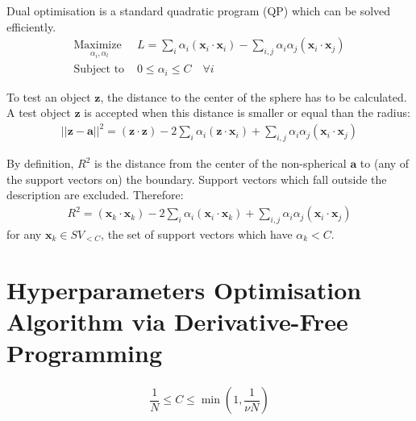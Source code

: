 \documentclass[3p,times]{elsarticle}
\begin{document}
Dual optimisation is a standard quadratic program (QP) which can be solved efficiently.
\begin{subequations}\label{eq:svdd_dual}
\begin{align}
\underset{
	\begin{array}{c}
		 \alpha_i, \alpha_l
	\end{array}}{\text{Maximize }} & L = \sum_i \alpha_i \left( \mathbf{x}_i \cdot \mathbf{x}_i \right) - \sum_{i,j} \alpha_i \alpha_j \left( \mathbf{x}_i \cdot \mathbf{x}_j \right)\\
\text{Subject to } & 0 \le \alpha_i \le C \quad \forall i
\end{align}
\end{subequations}

To test an object $\mathbf{z}$, the distance to the center of the sphere has to be calculated. A test
object $\mathbf{z}$ is accepted when this distance is smaller or equal than the radius:
\begin{align}
\left|\left| \mathbf{z} - \mathbf{a} \right|\right|^2 = \left( \mathbf{z} \cdot \mathbf{z} \right) - 2 \sum_i \alpha_i \left( \mathbf{z} \cdot \mathbf{x}_i \right) + \sum_{i,j} \alpha_i \alpha_j \left( \mathbf{x}_i \cdot \mathbf{x}_j \right)
\end{align}

By definition, $R^2$ is the distance from the center of the non-spherical $\mathbf{a}$ to (any of the support vectors on) the boundary. Support vectors which fall outside the description are excluded. Therefore:
\begin{align}
R^2 = \left( \mathbf{x}_k \cdot \mathbf{x}_k \right) - 2 \sum_i \alpha_i \left( \mathbf{x}_i \cdot \mathbf{x}_k \right) + \sum_{i,j} \alpha_i \alpha_j \left( \mathbf{x}_i \cdot \mathbf{x}_j \right)
\end{align}
for any $\mathbf{x}_k \in SV_{<C}$, the set of support vectors which have $\alpha_k < C$.

\section{Hyperparameters Optimisation Algorithm via Derivative-Free Programming}

\cite{scholkopf2001estimating}

\cite{theissler2013autonomously}

\begin{align}
\dfrac{1}{N} \le C \le \min \left( 1, \dfrac{1}{\nu N} \right)
\end{align}
\end{document}
